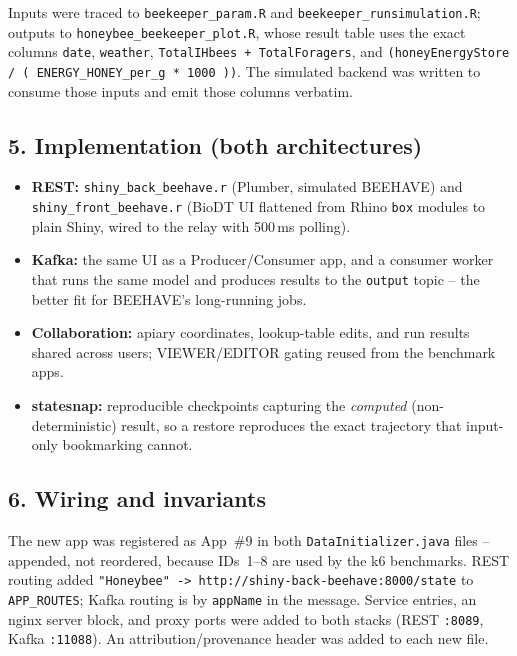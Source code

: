 Inputs were traced to \texttt{beekeeper\_param.R} and
\texttt{beekeeper\_runsimulation.R}; outputs to
\texttt{honeybee\_beekeeper\_plot.R}, whose result table uses the exact columns
\texttt{date}, \texttt{weather}, \texttt{TotalIHbees + TotalForagers}, and
\texttt{(honeyEnergyStore / ( ENERGY\_HONEY\_per\_g * 1000 ))}. The simulated
backend was written to consume those inputs and emit those columns verbatim.

\subsection*{5. Implementation (both architectures)}

\begin{itemize}
  \item \textbf{REST:} \texttt{shiny\_back\_beehave.r} (Plumber, simulated
    BEEHAVE) and \texttt{shiny\_front\_beehave.r} (BioDT UI flattened from Rhino
    \texttt{box} modules to plain Shiny, wired to the relay with 500\,ms polling).
  \item \textbf{Kafka:} the same UI as a Producer/Consumer app, and a consumer
    worker that runs the same model and produces results to the \texttt{output}
    topic -- the better fit for BEEHAVE's long-running jobs.
  \item \textbf{Collaboration:} apiary coordinates, lookup-table edits, and run
    results shared across users; VIEWER/EDITOR gating reused from the benchmark
    apps.
  \item \textbf{statesnap:} reproducible checkpoints capturing the
    \emph{computed} (non-deterministic) result, so a restore reproduces the exact
    trajectory that input-only bookmarking cannot.
\end{itemize}

\subsection*{6. Wiring and invariants}

The new app was registered as App~\#9 in both \texttt{DataInitializer.java}
files -- appended, not reordered, because IDs~1--8 are used by the k6 benchmarks.
REST routing added \texttt{"Honeybee" -> http://shiny-back-beehave:8000/state}
to \texttt{APP\_ROUTES}; Kafka routing is by \texttt{appName} in the message.
Service entries, an nginx server block, and proxy ports were added to both
stacks (REST \texttt{:8089}, Kafka \texttt{:11088}). An attribution/provenance
header was added to each new file.

